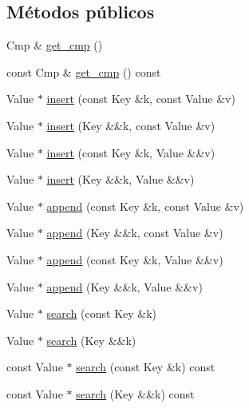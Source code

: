 \subsection*{Métodos públicos}
\begin{DoxyCompactItemize}
\item 
Cmp \& \hyperlink{class_designar_1_1_gen_map_a33a00f9275b3ff7788bbd93c39c25c9f}{get\+\_\+cmp} ()
\item 
const Cmp \& \hyperlink{class_designar_1_1_gen_map_a81de02316324ed11c8a668fe2d35d2d3}{get\+\_\+cmp} () const
\item 
Value $\ast$ \hyperlink{class_designar_1_1_gen_map_aaecc59b3f9c206d0d962bd1cd6bfc4d6}{insert} (const Key \&k, const Value \&v)
\item 
Value $\ast$ \hyperlink{class_designar_1_1_gen_map_aabd1f531f63985a2eabbeea49d90156e}{insert} (Key \&\&k, const Value \&v)
\item 
Value $\ast$ \hyperlink{class_designar_1_1_gen_map_a8fc2565be30a92687eea7f752b289751}{insert} (const Key \&k, Value \&\&v)
\item 
Value $\ast$ \hyperlink{class_designar_1_1_gen_map_a514311c4192292ff816931e0c42f929f}{insert} (Key \&\&k, Value \&\&v)
\item 
Value $\ast$ \hyperlink{class_designar_1_1_gen_map_ad5e2c8b57f6264ab98eec3a93e85b1a1}{append} (const Key \&k, const Value \&v)
\item 
Value $\ast$ \hyperlink{class_designar_1_1_gen_map_aeee7a9267c7c54044e7dca399658d9a7}{append} (Key \&\&k, const Value \&v)
\item 
Value $\ast$ \hyperlink{class_designar_1_1_gen_map_a2c148d9d32bc86315444f1026d9ef482}{append} (const Key \&k, Value \&\&v)
\item 
Value $\ast$ \hyperlink{class_designar_1_1_gen_map_a3bb1fd57e4ff94c0e585b41a359d0c52}{append} (Key \&\&k, Value \&\&v)
\item 
Value $\ast$ \hyperlink{class_designar_1_1_gen_map_a6a0eb4fe87d7bcc739f6394d5fd8952e}{search} (const Key \&k)
\item 
Value $\ast$ \hyperlink{class_designar_1_1_gen_map_a1c3b2c788cc8c1a7b59e5afb66fffca4}{search} (Key \&\&k)
\item 
const Value $\ast$ \hyperlink{class_designar_1_1_gen_map_a39037bc9d24b92fdcc7a6289db00e59b}{search} (const Key \&k) const
\item 
const Value $\ast$ \hyperlink{class_designar_1_1_gen_map_a00517c31638c479dca955b9204a2275e}{search} (Key \&\&k) const
\item 

\end{DoxyCompactItemize}
